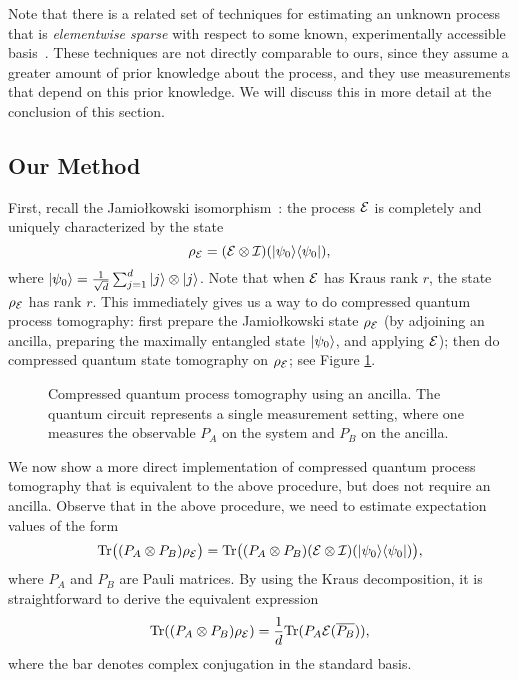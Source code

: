 Note that there is a related set of techniques for estimating an unknown process that is \textit{elementwise sparse} with respect to some known, experimentally accessible basis~\cite{Shabani2011}.  These techniques are not directly comparable to ours, since they assume a greater amount of prior knowledge about the process, and they use measurements that depend on this prior knowledge.  We will discuss this in more detail at the conclusion of this section.


\subsection{Our Method}


First, recall the Jamio\l{}kowski isomorphism~\cite{Jamiolkowski1972}:  the process $\mathcal{E}$ is completely and uniquely characterized by the state 
\[
	\rho_{\mathcal{E}} = (\mathcal{E}\otimes\mathcal{I})(|{\psi_0}\rangle\langle{\psi_0}|), 
\]
where $|{\psi_0}\rangle = \frac{1}{\sqrt{d}} \sum_{j=1}^{d} |{j}\rangle\otimes|{j}\rangle$.  Note that when $\mathcal{E}$ has Kraus rank $r$, the state $\rho_{\mathcal{E}}$ has rank $r$.  This immediately gives us a way to do compressed quantum process tomography: first prepare the Jamio\l{}kowski state $\rho_{\mathcal{E}}$ (by adjoining an ancilla, preparing the maximally entangled state $|{\psi_0}\rangle$, and applying $\mathcal{E}$); then do compressed quantum state tomography on $\rho_{\mathcal{E}}$; see Figure \ref{fig-qptancilla}.

\begin{figure}

\caption{\label{fig-qptancilla}Compressed quantum process tomography using an ancilla.  The quantum circuit represents a single measurement setting, where one measures the observable $P_A$ on the system and $P_B$ on the ancilla.}
\end{figure}

We now show a more direct implementation of compressed quantum process tomography that is equivalent to the above procedure, but does not require an ancilla. Observe that in the above procedure, we need to estimate expectation values of the form 
\begin{equation*}
\mathrm{Tr}\bigl((P_A\otimes P_B) \rho_{\mathcal{E}}\bigr) = \mathrm{Tr}\bigl((P_A\otimes P_B) (\mathcal{E}\otimes\mathcal{I}) (|{\psi_0}\rangle\langle{\psi_0}|)\bigr), 
\end{equation*}
where $P_A$ and $P_B$ are Pauli matrices.  By using the Kraus decomposition, it is straightforward to derive the equivalent expression
\begin{align}\label{eqn-qpt-ev}
	\mathrm{Tr}((P_A \otimes P_B) \rho_{\mathcal{E}}) = \frac{1}{d} \mathrm{Tr}(P_A \mathcal{E}(\overline{P_B})), 
\end{align}
where the bar denotes complex conjugation in the standard basis.

